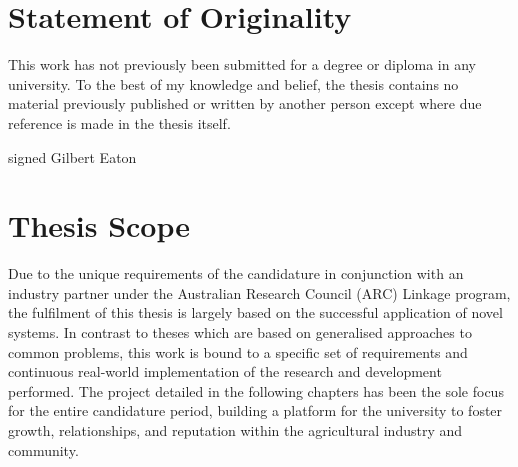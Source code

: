 \documentclass[fleqn,twoside,12pt]{report}
\begin{document}
\vspace*{\fill}%




\newpage

\chapter*{Statement of Originality}

This work has not previously been submitted for a degree or diploma in any university. To the best of my knowledge and belief, the thesis contains no material previously published or written by another person except where due reference is made in the thesis itself.

\vspace{30pt}

signed
Gilbert Eaton



\chapter*{Thesis Scope}

Due to the unique requirements of the candidature in conjunction with an industry partner under the Australian Research Council (ARC) Linkage program, the fulfilment of this thesis is largely based on the successful application of novel systems. In contrast to theses which are based on generalised approaches to common problems, this work is bound to a specific set of requirements and continuous real-world implementation of the research and development performed. The project detailed in the following chapters has been the sole focus for the entire candidature period, building a platform for the university to foster growth, relationships, and reputation within the agricultural industry and community.




\vspace*{\fill}%
\end{document}
